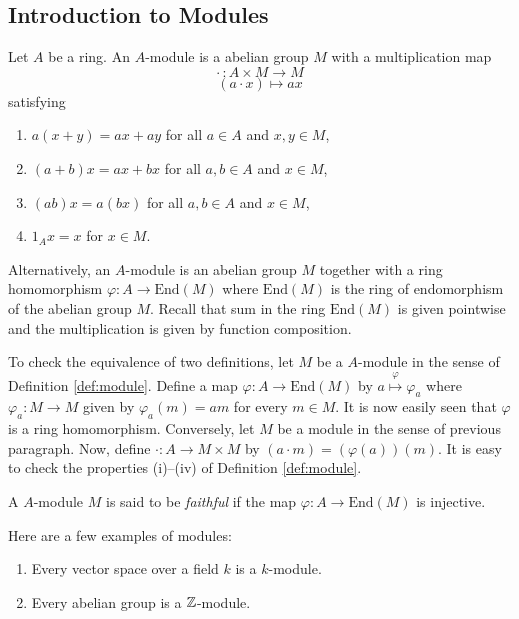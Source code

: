 \subsection{Introduction to Modules}

\begin{definition}
    Let $A$ be a ring. An $A$-module is a abelian group $M$ with a multiplication map
    $$\cdot \, : A\times M \to M $$
    $$(a \cdot x ) \mapsto ax$$
    satisfying
    \begin{enumerate}[label=(\roman*)]
	\item $a(x+y)=ax+ay$ for all $a\in A$ and $x,y \in M$,
	\item $\left( a+b \right) x = ax+bx$ for all $a,b\in A$ and $x\in M$,
	\item $(ab)x=a(bx)$ for all $a,b\in A$ and $x\in M$,
	\item $1_A x = x$ for $x\in M$.
    \end{enumerate}
    \label{def:module}

\end{definition}

Alternatively, an $A$-module is an abelian group $M$ together with a ring homomorphism $\varphi : A \to \text{End} (M)$ where $\text{End} (M)$ is the ring of endomorphism of the abelian group $M$. Recall that sum in the ring $\text{End} (M)$ is given pointwise and the multiplication is given by function composition. 

To check the equivalence of two definitions, let $M$ be a $A$-module in the sense of Definition \ref{def:module}. Define a map $\varphi : A \to \text{End} (M)$ by $a \stackrel{\varphi}{\mapsto} \varphi _a$ where $\varphi_a : M \to M$ given by $\varphi _a (m ) = am$ for every $m \in M$. It is now easily seen that $\varphi$ is a ring homomorphism. Conversely, let $M$ be a module in the sense of previous paragraph. Now, define $\cdot : A \to M \times M$ by $(a \cdot m ) = (\varphi (a)) (m)$. It is easy to check the properties (i)--(iv) of Definition \ref{def:module}.

\begin{definition}
    A $A$-module $M$ is said to be \textit{faithful} if the map $\varphi : A \to \text{End} (M)$ is injective.
    \label{def:module-faithful}
\end{definition}

\begin{example}
Here are a few examples of modules:
    \begin{enumerate} 	\item Every vector space over a field $k$ is a $k$-module.
	\item Every abelian group is a $\mathbb Z$-module.
    \end{enumerate}
\end{example}

